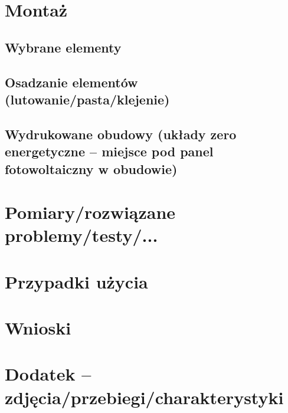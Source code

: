 	\section{Montaż}
		\subsection{Wybrane elementy}
		\subsection{Osadzanie elementów (lutowanie/pasta/klejenie)}
		\subsection{Wydrukowane obudowy (układy zero energetyczne -- miejsce pod panel fotowoltaiczny w obudowie)} 
		
	
	\section{Pomiary/rozwiązane problemy/testy/...}
	
	\section{Przypadki użycia}
	
	\section{Wnioski} 
	
	
	\section{Dodatek -- zdjęcia/przebiegi/charakterystyki}
	
	
	
	
	
